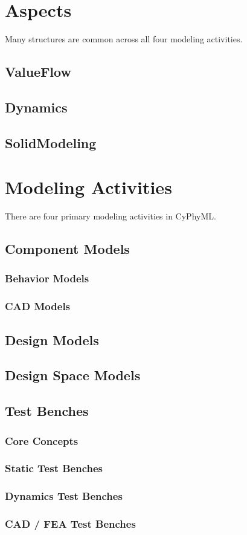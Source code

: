 \documentclass{article}
\begin{document}
\section{Aspects}
Many structures are common across all four modeling activities.
\subsection{ValueFlow}

\subsection{Dynamics}

\subsection{SolidModeling}



\section{Modeling Activities}
There are four primary modeling activities in CyPhyML.
\subsection{Component Models}
\subsubsection{Behavior Models}

\subsubsection{CAD Models}


\subsection{Design Models}


\subsection{Design Space Models}
\label{sec:designspace}


\subsection{Test Benches}
\subsubsection{Core Concepts}

\subsubsection{Static Test Benches}

\subsubsection{Dynamics Test Benches}

\subsubsection{CAD / FEA Test Benches}

\end{document}
